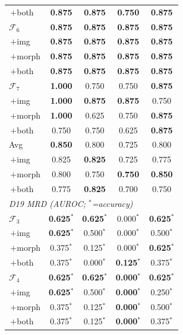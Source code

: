 \documentclass[pdflatex,sn-nature]{sn-jnl}
\begin{document}
\begin{table}[p]
\begin{tabular}{@{}l cccc@{}}
\;\,$+$both          & \textbf{0.875} & \textbf{0.875} & \textbf{0.750} & \textbf{0.875} \\
\addlinespace[0.3pt]
$\mathcal{F}_6$      & \textbf{0.875} & \textbf{0.875} & \textbf{0.875} & \textbf{0.875} \\
\;\,$+$img           & \textbf{0.875} & \textbf{0.875} & \textbf{0.875} & \textbf{0.875} \\
\;\,$+$morph         & \textbf{0.875} & \textbf{0.875} & \textbf{0.875} & \textbf{0.875} \\
\;\,$+$both          & \textbf{0.875} & \textbf{0.875} & \textbf{0.875} & \textbf{0.875} \\
\addlinespace[0.3pt]
$\mathcal{F}_7$      & \textbf{1.000} & 0.750 & 0.750 & \textbf{0.875} \\
\;\,$+$img           & \textbf{1.000} & \textbf{0.875} & \textbf{0.875} & 0.750 \\
\;\,$+$morph         & \textbf{1.000} & 0.625 & 0.750 & \textbf{0.875} \\
\;\,$+$both          & 0.750 & 0.750 & 0.625 & \textbf{0.875} \\
\addlinespace[2pt]
Avg & \textbf{0.850} & 0.800 & 0.725 & 0.800 \\
\;\,$+$img & 0.825 & \textbf{0.825} & 0.725 & 0.775 \\
\;\,$+$morph & 0.800 & 0.750 & \textbf{0.750} & \textbf{0.850} \\
\;\,$+$both & 0.775 & \textbf{0.825} & 0.700 & 0.750 \\
\midrule
\multicolumn{5}{l}{\textit{D19 MRD (AUROC; $^*$=accuracy)}} \\
$\mathcal{F}_3$      & \textbf{0.625$^*$} & \textbf{0.625$^*$} & 0.000$^*$ & \textbf{0.625$^*$} \\
\;\,$+$img           & \textbf{0.625$^*$} & 0.500$^*$ & 0.000$^*$ & 0.500$^*$ \\
\;\,$+$morph         & 0.375$^*$ & 0.125$^*$ & 0.000$^*$ & \textbf{0.625$^*$} \\
\;\,$+$both          & 0.375$^*$ & 0.000$^*$ & \textbf{0.125$^*$} & 0.375$^*$ \\
\addlinespace[0.3pt]
$\mathcal{F}_4$      & \textbf{0.625$^*$} & \textbf{0.625$^*$} & \textbf{0.000$^*$} & \textbf{0.625$^*$} \\
\;\,$+$img           & \textbf{0.625$^*$} & 0.500$^*$ & \textbf{0.000$^*$} & 0.250$^*$ \\
\;\,$+$morph         & 0.375$^*$ & 0.125$^*$ & \textbf{0.000$^*$} & 0.500$^*$ \\
\;\,$+$both          & 0.375$^*$ & 0.125$^*$ & \textbf{0.000$^*$} & 0.375$^*$ \\

\end{tabular}
\end{table}
\end{document}
